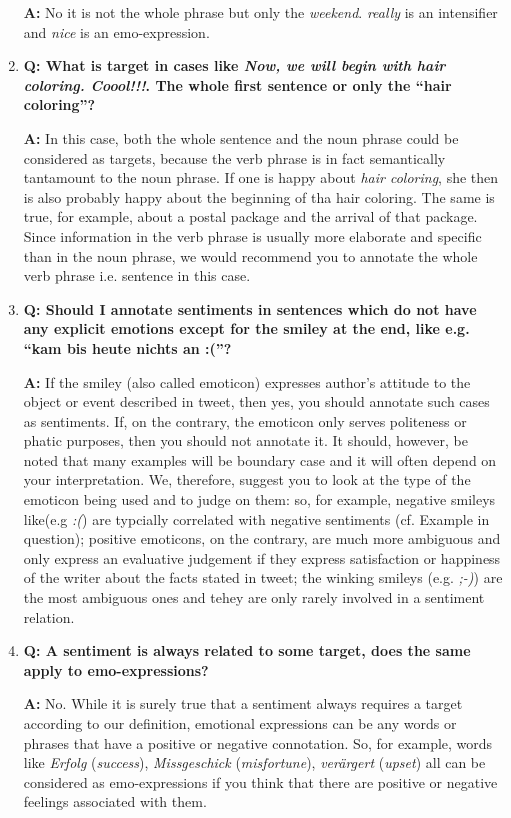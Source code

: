 \documentclass[11pt,a4paper]{article}
\theoremstyle{mytheoremstyle}
\begin{document}
\begin{enumerate}
  \textbf{A:} No it is not the whole phrase but only the
  \textit{weekend}. \textit{really} is an intensifier and
  \textit{nice} is an emo-expression.

\item\textbf{Q: What is target in cases like \textit{Now, we will
    begin with hair coloring.  Coool!!!}.  The whole first sentence or
  only the ``hair coloring''?}

\textbf{A:} In this case, both the whole sentence and the noun phrase
could be considered as targets, because the verb phrase is in fact
semantically tantamount to the noun phrase.  If one is happy about
\textit{hair coloring}, she then is also probably happy about the
beginning of tha hair coloring.  The same is true, for example, about
a postal package and the arrival of that package.  Since information
in the verb phrase is usually more elaborate and specific than in the
noun phrase, we would recommend you to annotate the whole verb phrase
i.e. sentence in this case.

\item\textbf{Q: Should I annotate sentiments in sentences which do not
  have any explicit emotions except for the smiley at the end, like
  e.g. ``kam bis heute nichts an :(''?}

\textbf{A:} If the smiley (also called emoticon) expresses author's
attitude to the object or event described in tweet, then yes, you
should annotate such cases as sentiments.  If, on the contrary, the
emoticon only serves politeness or phatic purposes, then you should
not annotate it.  It should, however, be noted that many examples will
be boundary case and it will often depend on your interpretation.  We,
therefore, suggest you to look at the type of the emoticon being used
and to judge on them: so, for example, negative smileys like(e.g
\textit{:(}) are typcially correlated with negative sentiments
(cf. Example in question); positive emoticons, on the contrary, are
much more ambiguous and only express an evaluative judgement if they
express satisfaction or happiness of the writer about the facts stated
in tweet; the winking smileys (e.g. \textit{;-)}) are the most
ambiguous ones and tehey are only rarely involved in a sentiment
relation.

\item\textbf{Q: A sentiment is always related to some target, does the
  same apply to emo-expressions?}

\textbf{A:} No.  While it is surely true that a sentiment always
requires a target according to our definition, emotional expressions
can be any words or phrases that have a positive or negative
connotation.  So, for example, words like \textit{Erfolg}
(\textit{success}), \textit{Missgeschick} (\textit{misfortune}),
\textit{ver\"argert} (\textit{upset}) all can be considered as
emo-expressions if you think that there are positive or negative
feelings associated with them.


\end{enumerate}
\end{document}
